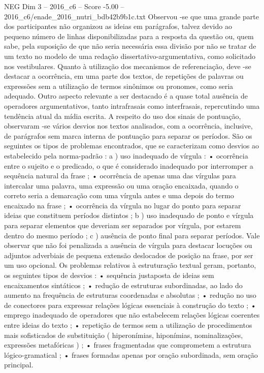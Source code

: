 \begin{textsample}{NEG Dim 3 – 2016\_c6 – Score -5.00 – 2016\_c6/enade\_2016\_nutri\_bdb42b9b1c.txt}
Observou -se que uma grande parte dos participantes não organizou as ideias em parágrafos, talvez devido ao pequeno número de linhas disponibilizadas para a resposta da questão ou, quem sabe, pela suposição de que não seria necessária essa divisão por não se tratar de um texto no modelo de uma redação dissertativo-argumentativa, como solicitado nos vestibulares.
Quanto à utilização dos mecanismos de referenciação, deve -se destacar a ocorrência, em uma parte dos textos, de repetições de palavras ou expressões sem a utilização de termos sinônimos ou pronomes, como seria adequado.
Outro aspecto relevante a ser destacado é a quase total ausência de operadores argumentativos, tanto intrafrasais como interfrasais, repercutindo uma tendência atual da mídia escrita.
A respeito do uso dos sinais de pontuação, observaram -se vários desvios nos textos analisados, com a ocorrência, inclusive, de parágrafos sem marca interna de pontuação para separar os períodos.
São os seguintes os tipos de problemas encontrados, que se caracterizam como desvios ao estabelecido pela norma-padrão : a ) uso inadequado de vírgula : • ocorrência entre o sujeito e o predicado, o que é considerado inadequado por interromper a sequência natural da frase ; • ocorrência de apenas uma das vírgulas para intercalar uma palavra, uma expressão ou uma oração encaixada, quando o correto seria a demarcação com uma vírgula antes e uma depois do termo encaixado na frase ; • ocorrência da vírgula no lugar do ponto para separar ideias que constituem períodos distintos ; b ) uso inadequado de ponto e vírgula para separar elementos que deveriam ser separados por vírgula, por estarem dentro do mesmo período ; c ) ausência de ponto final para separar períodos.
Vale observar que não foi penalizada a ausência de vírgula para destacar locuções ou adjuntos adverbiais de pequena extensão deslocados de posição na frase, por ser um uso opcional.
Os problemas relativos à estruturação textual geram, portanto, os seguintes tipos de desvios : • sequência justaposta de ideias sem encaixamentos sintáticos ; • redução de estruturas subordinadas, ao lado do aumento na frequência de estruturas coordenadas e absolutas ; • redução no uso de conectores para expressar relações lógicas essenciais à construção do texto ; • emprego inadequado de operadores que não estabelecem relações lógicas coerentes entre ideias do texto ; • repetição de termos sem a utilização de procedimentos mais sofisticados de substituição ( hiperonímias, hiponímias, nominalizações, expressões metafóricas ) ; • frases fragmentadas que comprometem a estrutura lógico-gramatical ; • frases formadas apenas por oração subordinada, sem oração principal.

\end{textsample}

